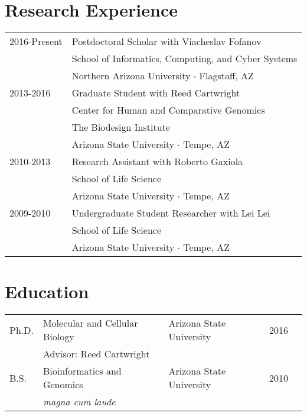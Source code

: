 \documentclass[11pt]{article}
\begin{document}
\section*{Research Experience}
\begin{tabularx}{\linewidth}{lX}
2016-Present& Postdoctoral Scholar with Viacheslav Fofanov\\
&School of Informatics, Computing, and Cyber Systems\\ \vspace{2mm}
&Northern Arizona University $\cdotp$ Flagstaff, AZ\\
2013-2016&Graduate Student with Reed Cartwright\\
&Center for Human and Comparative Genomics\\
&The Biodesign Institute\\ \vspace{2mm}
&Arizona State University $\cdotp$ Tempe, AZ\\
2010-2013&Research Assistant with Roberto Gaxiola\\
&School of Life Science\\ \vspace{2mm}
&Arizona State University $\cdotp$ Tempe, AZ\\
2009-2010&Undergraduate Student Researcher with Lei Lei\\
&School of Life Science\\
&Arizona State University $\cdotp$ Tempe, AZ\\
\end{tabularx}



\section*{Education}
\begin{tabular}[c]{lllll}
Ph.D.& Molecular and Cellular Biology& Arizona State University&2016\\
&\multicolumn{3}{l}{Advisor: Reed Cartwright}\\
B.S.&Bioinformatics and Genomics&Arizona State University& 2010\\
&\multicolumn{3}{l}{\textit{magna cum laude}}
\end{tabular}
\end{document}
